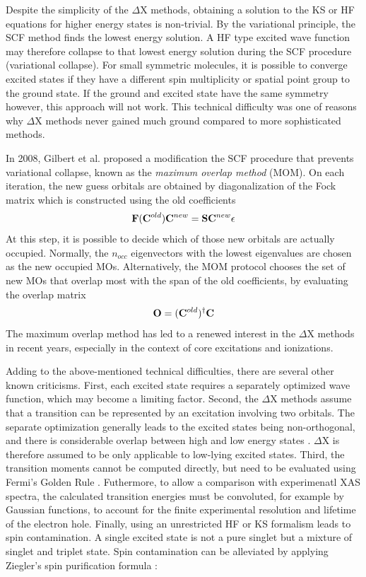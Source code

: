 Despite the simplicity of the $\Delta$X methods, obtaining a solution to the KS or HF equations for higher energy states is non-trivial. By the variational principle, the SCF method finds the lowest energy solution. A HF type excited wave function may therefore collapse to that lowest energy solution during the SCF procedure (variational collapse). For small symmetric molecules, it is possible to converge excited states if they have a different spin multiplicity or spatial point group to the ground state. If the ground and excited state have the same symmetry however, this approach will not work. This technical difficulty was one of reasons why $\Delta$X methods never gained much ground compared to more sophisticated methods.

In 2008, Gilbert et al. \cite{Gil2008} proposed a modification the SCF procedure that prevents variational collapse, known as the \emph{maximum overlap method} (MOM). On each iteration, the new guess orbitals are obtained by diagonalization of the Fock matrix which is constructed using the old coefficients
\begin{equation}
\mathbf{F}(\mathbf{C}^{old})\mathbf{C}^{new} = \mathbf{S}\mathbf{C}^{new}\epsilon
\end{equation}
\noindent At this step, it is possible to decide which of those new orbitals are actually occupied. Normally, the $n_{occ}$ eigenvectors with the lowest eigenvalues are chosen as the new occupied MOs. Alternatively, the MOM protocol chooses the set of new MOs that overlap most with the span of the old coefficients, by evaluating the overlap matrix
\begin{equation}
\mathbf{O} = (\mathbf{C}^{old})^{\dagger} \mathbf{C}
\end{equation}
\noindent The maximum overlap method has led to a renewed interest in the $\Delta$X methods in recent years, especially in the context of core excitations and ionizations. 

Adding to the above-mentioned technical difficulties, there are several other known criticisms. First, each excited state requires a separately optimized wave function, which may become a limiting factor. Second, the $\Delta$X methods assume that a transition can be represented by an excitation involving two orbitals. The separate optimization generally leads to the excited states being non-orthogonal, and there is considerable overlap between high and low energy states \cite{Dav1964,Dav1965,Gil2008}. $\Delta$X is therefore assumed to be only applicable to low-lying excited states. Third, the transition moments cannot be computed directly, but need to be evaluated using Fermi's Golden Rule \cite{Gro2008}. Futhermore, to allow a comparison with experimenatl XAS spectra, the calculated transition energies must be convoluted, for example by Gaussian functions, to 
account for the finite experimental resolution and  lifetime of the electron hole. Finally, using an unrestricted HF or KS formalism leads to spin contamination. A single excited state is not a pure singlet but a mixture of singlet and triplet state. Spin contamination can be alleviated by applying Ziegler's spin purification formula \cite{Zie1977}:


